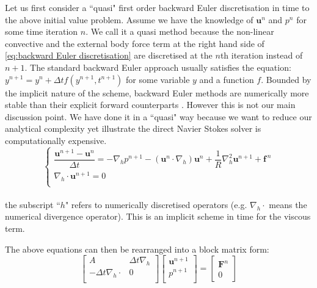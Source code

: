 Let us first consider a ``quasi" first order backward Euler discretisation in time to the above initial value problem. Assume we have the knowledge of $\textbf{u}^n$ and $p^n$ for some time iteration $n$. We call it a quasi method because the non-linear convective and the external body force term at the right hand side of \eqref{eq:backward Euler discretisation} are discretised at the $n$th iteration instead of $n+1$. The standard backward Euler approach usually satisfies the equation: $y^{n+1} = y^n + \Delta t f(y^{n+1},t^{n+1})$ for some variable $y$ and a function $f$. Bounded by the implicit nature of the scheme, backward Euler methods are numerically more stable than their explicit forward counterparts \cite{gear1971simultaneous}. However this is not our main discussion point. We have done it in a ``quasi" way because we want to reduce our analytical complexity yet illustrate the direct Navier Stokes solver is computationally expensive.\\

\begin{equation}\label{eq:backward Euler discretisation}
\begin{cases}
\dfrac{\textbf{u}^{n+1} - \textbf{u}^n}{\Delta t} = - \nabla_h p^{n+1} - (\textbf{u}^n\cdot\nabla_h)\textbf{u}^n + \dfrac{1}{R}\nabla_h^2\textbf{u}^{n+1} + \textbf{f}^{\,n}\\
\nabla_h \cdot \textbf{u}^{n+1} = 0\\
\end{cases}
\end{equation}\\

the subscript ``$h$" refers to numerically discretised operators (e.g. $\nabla_h \cdot$ means the numerical divergence operator).
This is an implicit scheme in time for the viscous term.

The above equations can then be rearranged into a block matrix form:\\
\begin{equation}\label{backward Euler matrix form}
\begin{bmatrix}
A & \Delta t \nabla_h\\
-\Delta t \nabla_h \cdot & 0\\
\end{bmatrix}
\begin{bmatrix}
\textbf{u}^{n+1}\\
p^{n+1}\\
\end{bmatrix}
= \begin{bmatrix}
\textbf{F}^n\\
0
\end{bmatrix}
\end{equation}\\

